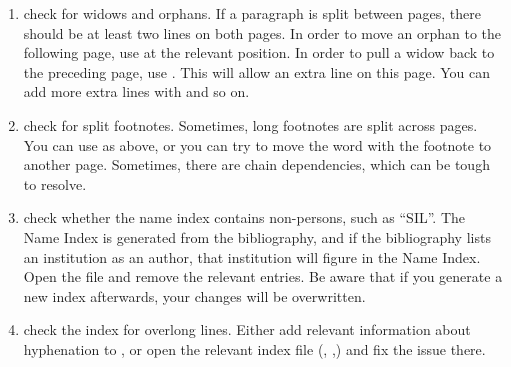 \begin{enumerate}
\item check for widows and orphans. If a paragraph is split between pages, there should be at least two lines on both pages. In order to move  an orphan to the following page, use  at the relevant position. In order to pull a widow back to the preceding page, use . This will allow an extra line on this page. You can add more extra lines with  and so on.  
\item check for split footnotes. Sometimes, long footnotes are split across pages. You can use  as above, or you can try to move the word with the footnote to another page. Sometimes, there are chain dependencies, which can be tough to resolve.
\item check whether the name index contains non-persons, such as ``SIL''. The Name Index is generated from the bibliography, and if the bibliography lists an institution as an author, that institution will figure in the Name Index. Open the  file and remove the relevant entries. Be aware that if you generate a new index afterwards, your changes will be overwritten. 
\item check the index for overlong lines. Either add relevant information about hyphenation to , or open the relevant index file (, ,) and fix the issue there.  
\end{enumerate} 